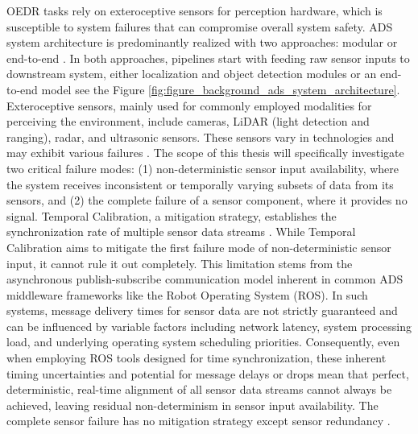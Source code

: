 OEDR tasks rely on exteroceptive sensors for perception hardware, which is susceptible to system failures that can compromise overall system safety. ADS system architecture is predominantly realized with two approaches: modular \cite{} or end-to-end \cite{}. In both approaches, pipelines start with feeding raw sensor inputs to downstream system, either localization and object detection modules or an end-to-end model see the Figure \ref{fig:figure_background_ads_system_architecture}. Exteroceptive sensors, mainly used for commonly employed modalities for perceiving the environment, include cameras, LiDAR (light detection and ranging), radar, and ultrasonic sensors. These sensors vary in technologies and may exhibit various failures \cite{}. The scope of this thesis will specifically investigate two critical failure modes: (1) non-deterministic sensor input availability, where the system receives inconsistent or temporally varying subsets of data from its sensors, and (2) the complete failure of a sensor component, where it provides no signal. Temporal Calibration, a mitigation strategy, establishes the synchronization rate of multiple sensor data streams \cite{}. While Temporal Calibration aims to mitigate the first failure mode of non-deterministic sensor input, it cannot rule it out completely. This limitation stems from the asynchronous publish-subscribe communication model inherent in common ADS middleware frameworks like the Robot Operating System (ROS). In such systems, message delivery times for sensor data are not strictly guaranteed and can be influenced by variable factors including network latency, system processing load, and underlying operating system scheduling priorities. Consequently, even when employing ROS tools designed for time synchronization, these inherent timing uncertainties and potential for message delays or drops mean that perfect, deterministic, real-time alignment of all sensor data streams cannot always be achieved, leaving residual non-determinism in sensor input availability. The complete sensor failure has no mitigation strategy except sensor redundancy \cite{}.

